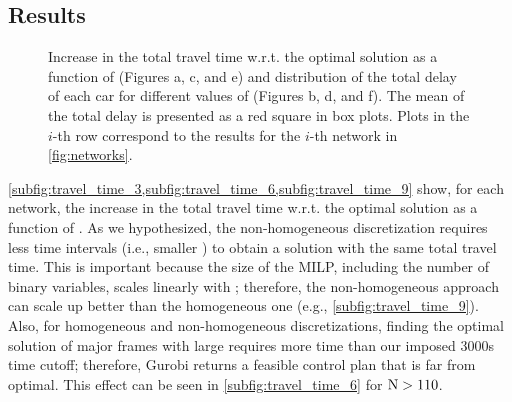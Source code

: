 \subsection{Results}


\begin{figure*}[t!]
\centering


%
\caption{Increase in the total travel time w.r.t. the optimal solution as a
function of \Nn (Figures a, c, and e) and distribution of the total delay of
each car for different values of \Nn (Figures b, d, and f).
%
The mean of the total delay is presented as a red square in box plots.
%
Plots in the $i$-th row correspond to the results for the $i$-th network in
\cref{fig:networks}.}
\label{fig:results}
\end{figure*}


%
\cref{subfig:travel_time_3,subfig:travel_time_6,subfig:travel_time_9} show, for
each network, the increase in the total travel time w.r.t. the optimal solution
as a function of \Nn.
%
As we hypothesized, the non-homogeneous discretization requires less time
intervals (i.e., smaller \Nn) to obtain a solution with the same total travel
time.
%
This is important because the size of the MILP, including the number of binary
variables, scales linearly with \Nn; therefore, the non-homogeneous approach can
scale up better than the homogeneous one (e.g., \cref{subfig:travel_time_9}).
%
Also, for homogeneous and non-homogeneous discretizations, finding the optimal
solution of major frames with large \Nn requires more time than our imposed
3000s time cutoff; therefore, Gurobi returns a feasible control plan that is far
from optimal.
%
This effect can be seen in \cref{subfig:travel_time_6} for $\mathrm{N} > 110$.



